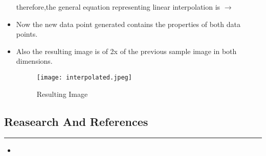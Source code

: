 \documentclass[a4paper, 12pt]{article}
\begin{document}
\begin{itemize}
therefore,the general equation representing linear interpolation is $\rightarrow$
\item Now the new data point generated contains the properties of both data points.
\item Also the resulting image is of 2x of the previous sample image in both dimensions.\\
\begin{figure}[htbp]
\centering
\texttt{[image: interpolated.jpeg]}
\caption{Resulting Image}

\end{figure}
\end{itemize}
\newpage
\begin{center}
\section{\textbf{Reasearch And References }}\hrule
\begin{itemize}
\item 
\end{itemize}
\end{center}
\end{document}
